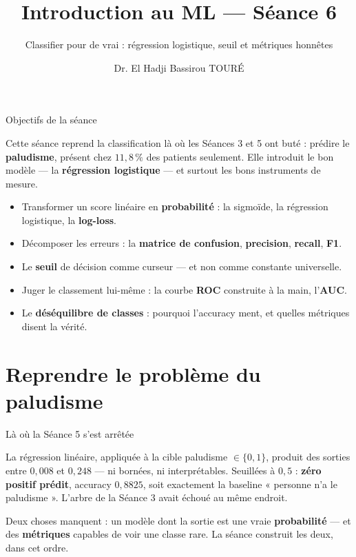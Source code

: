 \documentclass[aspectratio=169,11pt]{beamer}
\title{Introduction au ML — Séance 6}
\subtitle{Classifier pour de vrai : régression logistique, seuil et métriques honnêtes}
\author{Dr. El Hadji Bassirou TOURÉ}
\institute{Département de Mathématiques et Informatique\\ Faculté des Sciences et Techniques\\ Université Cheikh Anta Diop de Dakar}
\date{}
\begin{document}
\begin{frame}\titlepage\end{frame}

\begin{frame}{Objectifs de la séance}
\begin{ucaddef}[Contenu]
{\small Cette séance reprend la classification là où les Séances 3 et 5 ont buté : prédire le \textbf{paludisme}, présent chez $11{,}8\,\%$ des patients seulement. Elle introduit le bon modèle — la \textbf{régression logistique} — et surtout les bons instruments de mesure.}
\end{ucaddef}
\begin{itemize}\small
  \item Transformer un score linéaire en \textbf{probabilité} : la sigmoïde, la régression logistique, la \textbf{log-loss}.
  \item Décomposer les erreurs : la \textbf{matrice de confusion}, \textbf{precision}, \textbf{recall}, \textbf{F1}.
  \item Le \textbf{seuil} de décision comme curseur — et non comme constante universelle.
  \item Juger le classement lui-même : la courbe \textbf{ROC} construite à la main, l'\textbf{AUC}.
  \item Le \textbf{déséquilibre de classes} : pourquoi l'accuracy ment, et quelles métriques disent la vérité.
\end{itemize}
\end{frame}

\section{Reprendre le problème du paludisme}

\begin{frame}{Là où la Séance 5 s'est arrêtée}
\begin{ucadfront}
{\small La régression linéaire, appliquée à la cible paludisme $\in \{0,1\}$, produit des sorties entre $0{,}008$ et $0{,}248$ — ni bornées, ni interprétables. Seuillées à $0{,}5$ : \textbf{zéro positif prédit}, accuracy $0{,}8825$, soit exactement la baseline « personne n'a le paludisme ». L'arbre de la Séance 3 avait échoué au même endroit.}
\end{ucadfront}
{\small Deux choses manquent : un modèle dont la sortie est une vraie \textbf{probabilité} — et des \textbf{métriques} capables de voir une classe rare. La séance construit les deux, dans cet ordre.}
\end{frame}
\end{document}
